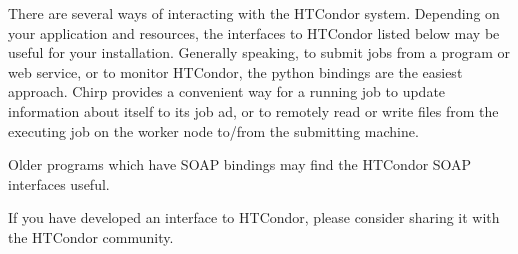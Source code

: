 There are several ways of interacting with the HTCondor system.  Depending on
your application and resources, the interfaces to HTCondor listed below may be
useful for your installation. Generally speaking, to submit jobs
from a program or web service, or to monitor HTCondor, the python bindings
are the easiest approach.  Chirp provides a convenient way for a running job
to update information about itself to its job ad, or to remotely read or write
files from the executing job on the worker node to/from the submitting machine.

Older programs which have SOAP bindings may find the HTCondor SOAP interfaces
useful.

If you have developed an interface to HTCondor,
please consider sharing it with the HTCondor community.








